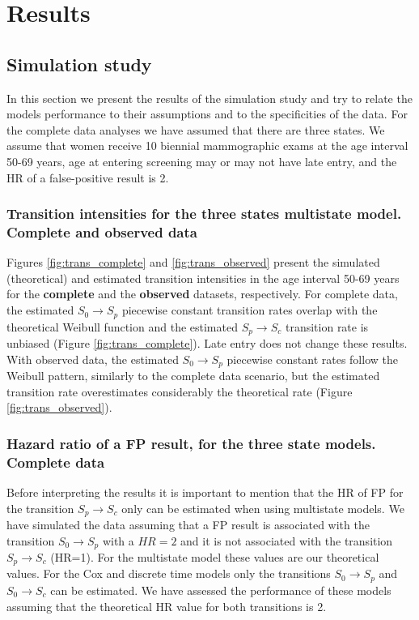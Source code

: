 \section{Results}
\subsection{Simulation study}
In this section we present the results of the simulation study and try to relate the models
performance to their assumptions and to the specificities of the data. For the complete data
analyses we have assumed that there are three states. We assume that women receive 10 biennial
mammographic exams at the age interval 50-69 years, age at entering screening may or may not have
late entry, and the HR of a false-positive result is 2.

\subsubsection{Transition intensities for the three states multistate model. Complete and observed
               data}
Figures \ref{fig:trans_complete} and \ref{fig:trans_observed} present the simulated (theoretical)
and estimated transition intensities in the age interval 50-69 years for the \textbf{complete} and
the \textbf{observed} datasets, respectively. For complete data, the estimated
$S_0 \rightarrow S_p$ piecewise constant transition rates overlap with the theoretical Weibull
function and the estimated $S_p \rightarrow S_c$ transition rate is unbiased (Figure
\ref{fig:trans_complete}). Late entry does not change these results. With observed data, the
estimated $S_0 \rightarrow S_p$ piecewise constant rates follow the Weibull pattern, similarly to
the complete data scenario, but the estimated transition rate overestimates considerably the
theoretical rate (Figure \ref{fig:trans_observed}).

\subsubsection{Hazard ratio of a FP result, for the three state models. Complete data}
Before interpreting the results it is important to mention that the HR of FP for the transition
$S_p \rightarrow S_c$ only can be estimated when using multistate models. We have simulated the
data assuming that a FP result is associated with the transition $S_0 \rightarrow S_p$ with a
$HR = 2$ and it is not associated with the transition $S_p \rightarrow S_c$ (HR=1). For the
multistate model these values are our theoretical values. For the Cox and discrete time models only
the transitions $S_0 \rightarrow S_p$ and $S_0 \rightarrow S_c$ can be estimated. We have assessed
the performance of these models assuming that the theoretical HR value for both transitions is 2.

